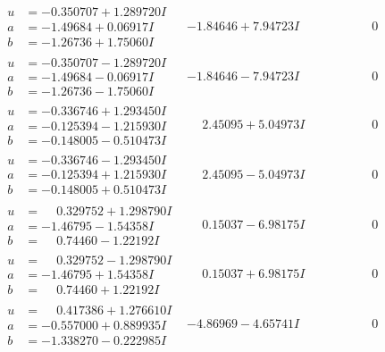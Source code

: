\documentclass[1p]{elsarticle_modified}
\theoremstyle{definition}
\begin{document}
$$\begin{array}{c|c|c}
\begin{aligned}
u &= -0.350707 + 1.289720 I \\
a &= -1.49684 + 0.06917 I \\
b &= -1.26736 + 1.75060 I\end{aligned}
 & -1.84646 + 7.94723 I & \phantom{-0.000000 } 0 \\ \hline\begin{aligned}
u &= -0.350707 - 1.289720 I \\
a &= -1.49684 - 0.06917 I \\
b &= -1.26736 - 1.75060 I\end{aligned}
 & -1.84646 - 7.94723 I & \phantom{-0.000000 } 0 \\ \hline\begin{aligned}
u &= -0.336746 + 1.293450 I \\
a &= -0.125394 - 1.215930 I \\
b &= -0.148005 - 0.510473 I\end{aligned}
 & \phantom{-}2.45095 + 5.04973 I & \phantom{-0.000000 } 0 \\ \hline\begin{aligned}
u &= -0.336746 - 1.293450 I \\
a &= -0.125394 + 1.215930 I \\
b &= -0.148005 + 0.510473 I\end{aligned}
 & \phantom{-}2.45095 - 5.04973 I & \phantom{-0.000000 } 0 \\ \hline\begin{aligned}
u &= \phantom{-}0.329752 + 1.298790 I \\
a &= -1.46795 - 1.54358 I \\
b &= \phantom{-}0.74460 - 1.22192 I\end{aligned}
 & \phantom{-}0.15037 - 6.98175 I & \phantom{-0.000000 } 0 \\ \hline\begin{aligned}
u &= \phantom{-}0.329752 - 1.298790 I \\
a &= -1.46795 + 1.54358 I \\
b &= \phantom{-}0.74460 + 1.22192 I\end{aligned}
 & \phantom{-}0.15037 + 6.98175 I & \phantom{-0.000000 } 0 \\ \hline\begin{aligned}
u &= \phantom{-}0.417386 + 1.276610 I \\
a &= -0.557000 + 0.889935 I \\
b &= -1.338270 - 0.222985 I\end{aligned}
 & -4.86969 - 4.65741 I & \phantom{-0.000000 } 0 \\ \hline\begin{aligned}

\end{aligned}
\end{array}$$
\end{document}
